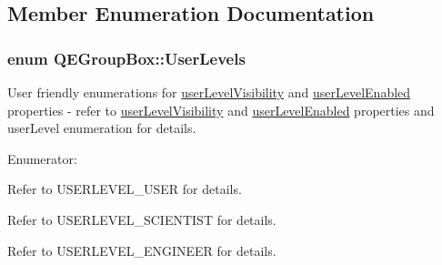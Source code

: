 \subsection{Member Enumeration Documentation}
\hypertarget{classQEGroupBox_ad5a2c847226aa067c44f86ed42ddaba8}{
\subsubsection[{UserLevels}]{\setlength{\rightskip}{0pt plus 5cm}enum {\bf QEGroupBox::UserLevels}}}
\label{classQEGroupBox_ad5a2c847226aa067c44f86ed42ddaba8}
User friendly enumerations for \hyperlink{classQEGroupBox_af592de1c93b6a919b9431c0dc3868dcc}{userLevelVisibility} and \hyperlink{classQEGroupBox_ad26f2a98dccecbdfbe200e3f032262fb}{userLevelEnabled} properties -\/ refer to \hyperlink{classQEGroupBox_af592de1c93b6a919b9431c0dc3868dcc}{userLevelVisibility} and \hyperlink{classQEGroupBox_ad26f2a98dccecbdfbe200e3f032262fb}{userLevelEnabled} properties and userLevel enumeration for details. \begin{Desc}
\item[Enumerator: ]\par
\begin{description}
\item[{\em 
\hypertarget{classQEGroupBox_ad5a2c847226aa067c44f86ed42ddaba8af266b3d599e59d87c500c8a5e870b4f6}{
User}
\label{classQEGroupBox_ad5a2c847226aa067c44f86ed42ddaba8af266b3d599e59d87c500c8a5e870b4f6}
}]Refer to USERLEVEL\_\-USER for details. \item[{\em 
\hypertarget{classQEGroupBox_ad5a2c847226aa067c44f86ed42ddaba8a37e2ed84893fe0df0649aad7e32704be}{
Scientist}
\label{classQEGroupBox_ad5a2c847226aa067c44f86ed42ddaba8a37e2ed84893fe0df0649aad7e32704be}
}]Refer to USERLEVEL\_\-SCIENTIST for details. \item[{\em 
\hypertarget{classQEGroupBox_ad5a2c847226aa067c44f86ed42ddaba8af3fa6b68de62f134049b7b1f4b7a6310}{
Engineer}
\label{classQEGroupBox_ad5a2c847226aa067c44f86ed42ddaba8af3fa6b68de62f134049b7b1f4b7a6310}
}]Refer to USERLEVEL\_\-ENGINEER for details. \end{description}
\end{Desc}



